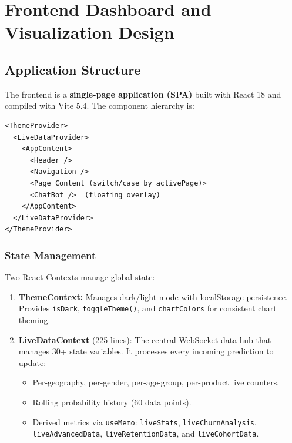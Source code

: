\documentclass[12pt, a4paper]{report}
\begin{document}
\chapter{Frontend Dashboard and Visualization Design}

\section{Application Structure}

The frontend is a \textbf{single-page application (SPA)} built with React 18 and compiled with Vite 5.4. The component hierarchy is:

\begin{verbatim}
<ThemeProvider>
  <LiveDataProvider>
    <AppContent>
      <Header />
      <Navigation />
      <Page Content (switch/case by activePage)>
      <ChatBot />  (floating overlay)
    </AppContent>
  </LiveDataProvider>
</ThemeProvider>
\end{verbatim}

\subsection{State Management}

Two React Contexts manage global state:

\begin{enumerate}
    \item \textbf{ThemeContext:} Manages dark/light mode with localStorage persistence. Provides \texttt{isDark}, \texttt{toggleTheme()}, and \texttt{chartColors} for consistent chart theming.
    \item \textbf{LiveDataContext} (225 lines): The central WebSocket data hub that manages 30+ state variables. It processes every incoming prediction to update:
    \begin{itemize}
        \item Per-geography, per-gender, per-age-group, per-product live counters.
        \item Rolling probability history (60 data points).
        \item Derived metrics via \texttt{useMemo}: \texttt{liveStats}, \texttt{liveChurnAnalysis}, \texttt{liveAdvancedData}, \texttt{liveRetentionData}, and \texttt{liveCohortData}.
    \end{itemize}
\end{enumerate}
\end{document}
